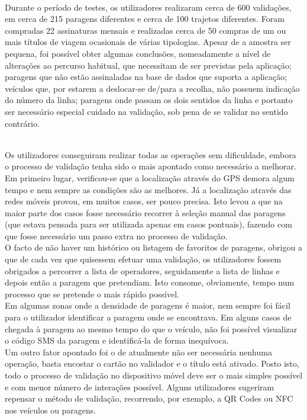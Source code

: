 ~\\Durante o período de testes, os utilizadores realizaram cerca de 600 validações, em cerca de 215 paragens diferentes e cerca de 100 trajetos diferentes. Foram compradas 22 assinaturas mensais e realizadas cerca de 50 compras de um ou mais títulos de viagem ocasionais de várias tipologias. Apesar de a amostra ser pequena, foi possível obter algumas conclusões, nomeadamente a nível de alterações ao percurso habitual, que necessitam de ser previstas pela aplicação; paragens que não estão assinaladas na base de dados que suporta a aplicação; veículos que, por estarem a deslocar-se de/para a recolha, não possuem indicação do número da linha; paragens onde passam os dois sentidos da linha e portanto ser necessário especial cuidado na validação, sob pena de se validar no sentido contrário.

~\\Os utilizadores conseguiram realizar todas as operações sem dificuldade, embora o processo de validação tenha sido o mais apontado como necessário a melhorar. 
\\Em primeiro lugar, verificou-se que a localização através do GPS demora algum tempo e nem sempre as condições são as melhores. Já a localização através das redes móveis provou, em muitos casos, ser pouco precisa. Isto levou a que na maior parte dos casos fosse necessário recorrer à seleção manual das paragens (que estava pensada para ser utilizada apenas em casos pontuais), fazendo com que fosse necessário um passo extra no processo de validação.
\\O facto de não haver um histórico ou listagem de favoritos de paragens, obrigou a que de cada vez que quisessem efetuar uma validação, os utilizadores fossem obrigados a percorrer a lista de operadores, seguidamente a lista de linhas e depois então a paragem que pretendiam. Isto consome, obviamente, tempo num processo que se pretende o mais rápido possível.
\\Em algumas zonas onde a densidade de paragens é maior, nem sempre foi fácil para o utilizador identificar a paragem onde se encontrava. Em alguns casos de chegada à paragem ao mesmo tempo do que o veículo, não foi possível visualizar o código SMS da paragem e identificá-la de forma inequívoca.
\\Um outro fator apontado foi o de atualmente não ser necessária nenhuma operação, basta encostar o cartão no validador e o título está ativado. Posto isto, todo o processo de validação no dispositivo móvel deve ser o mais simples possível e com menor número de interações possível. Alguns utilizadores sugeriram repensar o método de validação, recorrendo, por exemplo, a QR Codes ou NFC nos veículos ou paragens.

